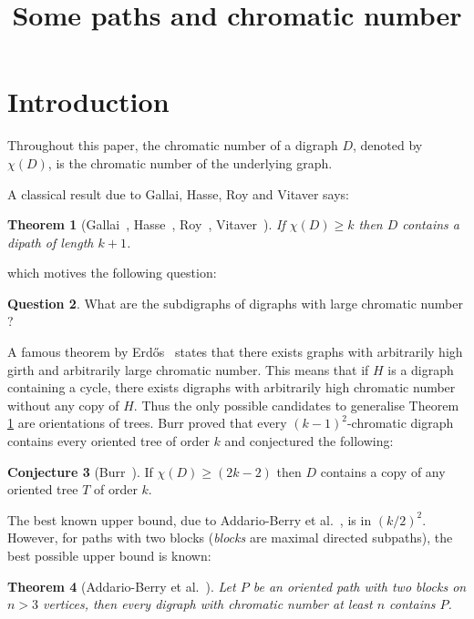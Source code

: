 \documentclass[utf8,10pt]{article}
\title{Some paths and chromatic number}
\theoremstyle{plain}
\newtheorem{theorem}{Theorem}
\theoremstyle{definition}
\newtheorem{conjecture}[theorem]{Conjecture}
\newtheorem{question}[theorem]{Question}
\theoremstyle{remark}
\begin{document}
\maketitle

\section{Introduction}
Throughout this paper, the chromatic number of a digraph $D$, denoted by $\chi(D)$, is the chromatic number of the underlying graph. 

A classical result due to Gallai, Hasse, Roy and Vitaver says: 

\begin{theorem}[Gallai~\cite{Gal68}, Hasse~\cite{Has64}, Roy~\cite{Roy67}, Vitaver~\cite{Vit62}]\label{thm:gallairoy}
	If $\chi(D) \geq k$ then $D$ contains a dipath of length $k+1$.  
\end{theorem}   

which motives the following question:

\begin{question}
What are the subdigraphs of digraphs with large chromatic number ?
\end{question}



A famous theorem by Erd\H{o}s~\cite{Erd59} states that there exists graphs with arbitrarily high girth and arbitrarily large
chromatic number. This means that if $H$ is a digraph containing a cycle, there exists digraphs with arbitrarily high 
chromatic number without any copy of $H$. Thus the only possible candidates to generalise Theorem \ref{thm:gallairoy} are orientations
of trees.
Burr proved that every $(k-1)^2$-chromatic digraph contains every oriented tree of order $k$ and conjectured the following:

\begin{conjecture}[Burr~\cite{Burr80}]\label{cnj:tn}
	 If $\chi(D) \geq (2k-2)$ then $D$ contains a copy of any oriented tree $T$ of order $k$.
\end{conjecture}
The best known upper bound, due to Addario-Berry et al.~\cite{AHS+13}, is in $(k/2)^2$.
However, for paths with two blocks ({\it blocks} are maximal directed subpaths), the best possible upper bound is known:

\begin{theorem}[Addario-Berry et al.~\cite{AHT07}]\label{thm:2blocks}
Let $P$ be an oriented path with two blocks on $n > 3$ vertices, then every digraph with chromatic number at least $n$ contains $P$. 
\end{theorem}
\end{document}
